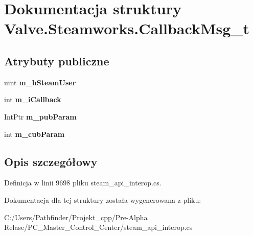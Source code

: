 \hypertarget{struct_valve_1_1_steamworks_1_1_callback_msg__t}{}\section{Dokumentacja struktury Valve.\+Steamworks.\+Callback\+Msg\+\_\+t}
\label{struct_valve_1_1_steamworks_1_1_callback_msg__t}
\subsection*{Atrybuty publiczne}
\begin{DoxyCompactItemize}
\item 
\mbox{\label{struct_valve_1_1_steamworks_1_1_callback_msg__t_adeac0acd5a1649108fab8bb82ffee801}} 
uint {\bfseries m\+\_\+h\+Steam\+User}
\item 
\mbox{\label{struct_valve_1_1_steamworks_1_1_callback_msg__t_a74c373f0ff628ac911472638bc70060b}} 
int {\bfseries m\+\_\+i\+Callback}
\item 
\mbox{\label{struct_valve_1_1_steamworks_1_1_callback_msg__t_aa800d50a60eadbb8e89a9bd794147d0e}} 
Int\+Ptr {\bfseries m\+\_\+pub\+Param}
\item 
\mbox{\label{struct_valve_1_1_steamworks_1_1_callback_msg__t_ad9e9390fe873759af05919a47dc51422}} 
int {\bfseries m\+\_\+cub\+Param}
\end{DoxyCompactItemize}


\subsection{Opis szczegółowy}


Definicja w linii 9698 pliku steam\+\_\+api\+\_\+interop.\+cs.



Dokumentacja dla tej struktury została wygenerowana z pliku\+:\begin{DoxyCompactItemize}
\item 
C\+:/\+Users/\+Pathfinder/\+Projekt\+\_\+cpp/\+Pre-\/\+Alpha Relase/\+P\+C\+\_\+\+Master\+\_\+\+Control\+\_\+\+Center/steam\+\_\+api\+\_\+interop.\+cs\end{DoxyCompactItemize}
